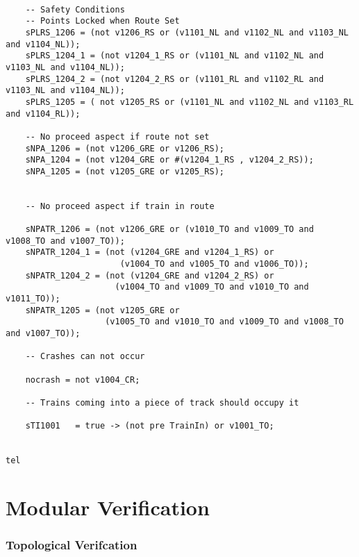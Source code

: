 \begin{verbatim}
	
	-- Safety Conditions
	-- Points Locked when Route Set
	sPLRS_1206 = (not v1206_RS or (v1101_NL and v1102_NL and v1103_NL and v1104_NL));
	sPLRS_1204_1 = (not v1204_1_RS or (v1101_NL and v1102_NL and v1103_NL and v1104_NL));
	sPLRS_1204_2 = (not v1204_2_RS or (v1101_RL and v1102_RL and v1103_NL and v1104_NL));
	sPLRS_1205 = ( not v1205_RS or (v1101_NL and v1102_NL and v1103_RL and v1104_RL));
	
	-- No proceed aspect if route not set
	sNPA_1206 = (not v1206_GRE or v1206_RS);
	sNPA_1204 = (not v1204_GRE or #(v1204_1_RS , v1204_2_RS));
    sNPA_1205 = (not v1205_GRE or v1205_RS);
	
	
	-- No proceed aspect if train in route
	
	sNPATR_1206 = (not v1206_GRE or (v1010_TO and v1009_TO and v1008_TO and v1007_TO));
	sNPATR_1204_1 = (not (v1204_GRE and v1204_1_RS) or
                       (v1004_TO and v1005_TO and v1006_TO));
	sNPATR_1204_2 = (not (v1204_GRE and v1204_2_RS) or 
                      (v1004_TO and v1009_TO and v1010_TO and v1011_TO));
	sNPATR_1205 = (not v1205_GRE or 
                    (v1005_TO and v1010_TO and v1009_TO and v1008_TO and v1007_TO));

	-- Crashes can not occur
	
	nocrash = not v1004_CR;
	
	-- Trains coming into a piece of track should occupy it
	
	sTI1001   = true -> (not pre TrainIn) or v1001_TO;
	
	
tel

\end{verbatim}


\section{Modular Verification}

\subsubsection{Topological Verifcation}


